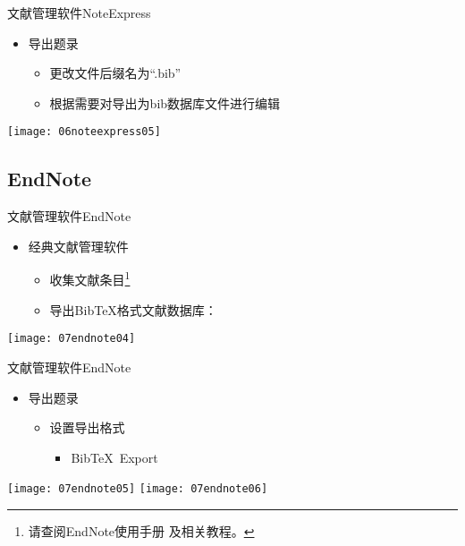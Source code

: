 \documentclass[fontset = none, t]{ctexbeamer}
\begin{document}
\begin{frame}[fragile]{文献管理软件}{NoteExpress}
  \begin{spacing}{1.2}
    \begin{itemize}
    \item 导出题录
      \begin{itemize}
      \item 更改文件后缀名为\enquote{.bib}
      \item 根据需要对导出为bib数据库文件进行编辑
      \end{itemize}
    \end{itemize}    
    \begin{center}
      \texttt{[image: 06noteexpress05]}
    \end{center}
  \end{spacing}
\end{frame}
\subsection[EndNote]{EndNote}
\begin{frame}[fragile]{文献管理软件}{EndNote}
  \begin{spacing}{1.5}
    \begin{itemize}
    \item 经典文献管理软件
      \begin{itemize}
      \item 收集文献条目\footnote[frame, 2]{请查阅EndNote使用手册
          及相关教程。}
      \item 导出Bib\TeX 格式文献数据库：
      \end{itemize}
    \end{itemize}    
    \begin{center}
      \texttt{[image: 07endnote04]}
    \end{center}
  \end{spacing}
\end{frame}

\begin{frame}[fragile]{文献管理软件}{EndNote}
  \begin{spacing}{1.2}
    \begin{itemize}
    \item 导出题录
      \begin{itemize}
      \item 设置导出格式
        \begin{itemize}
        \item Bib\TeX\ Export
        \end{itemize}
      \end{itemize}
    \end{itemize}
    \begin{center}
      \texttt{[image: 07endnote05]}\quad
      \texttt{[image: 07endnote06]}
    \end{center}
  \end{spacing}
\end{frame}
\end{document}
